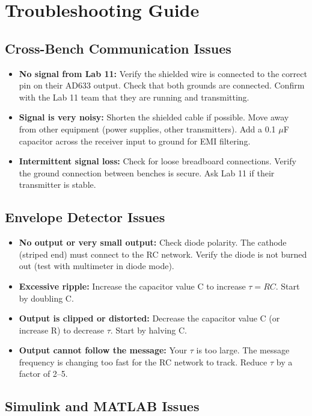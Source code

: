 \documentclass[11pt,letterpaper]{article}
\begin{document}
\section{Troubleshooting Guide}

\subsection{Cross-Bench Communication Issues}

\begin{itemize}
    \item \textbf{No signal from Lab 11:} Verify the shielded wire is connected to the correct pin on their AD633 output. Check that both grounds are connected. Confirm with the Lab 11 team that they are running and transmitting.
    \item \textbf{Signal is very noisy:} Shorten the shielded cable if possible. Move away from other equipment (power supplies, other transmitters). Add a 0.1 $\mu$F capacitor across the receiver input to ground for EMI filtering.
    \item \textbf{Intermittent signal loss:} Check for loose breadboard connections. Verify the ground connection between benches is secure. Ask Lab 11 if their transmitter is stable.
\end{itemize}

\subsection{Envelope Detector Issues}

\begin{itemize}
    \item \textbf{No output or very small output:} Check diode polarity. The cathode (striped end) must connect to the RC network. Verify the diode is not burned out (test with multimeter in diode mode).
    \item \textbf{Excessive ripple:} Increase the capacitor value C to increase $\tau = RC$. Start by doubling C.
    \item \textbf{Output is clipped or distorted:} Decrease the capacitor value C (or increase R) to decrease $\tau$. Start by halving C.
    \item \textbf{Output cannot follow the message:} Your $\tau$ is too large. The message frequency is changing too fast for the RC network to track. Reduce $\tau$ by a factor of 2--5.
\end{itemize}

\subsection{Simulink and MATLAB Issues}
\end{document}

